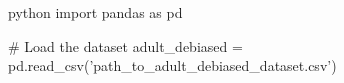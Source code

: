 python
import pandas as pd

# Load the dataset
adult_debiased = pd.read_csv('path_to_adult_debiased_dataset.csv')